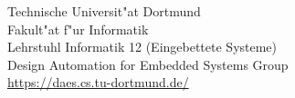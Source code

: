 \begin{titlepage}
    \vspace*{2.5cm}
    \begin{minipage}[b]{8cm}
        \small
        \raggedright
        Technische Universit"at Dortmund \\
        Fakult"at f"ur Informatik\\
        Lehrstuhl Informatik 12 (Eingebettete Systeme)\\
        Design Automation for Embedded Systems Group\\
        \url{https://daes.cs.tu-dortmund.de/}
    \end{minipage}
    \normalsize

\end{titlepage}
